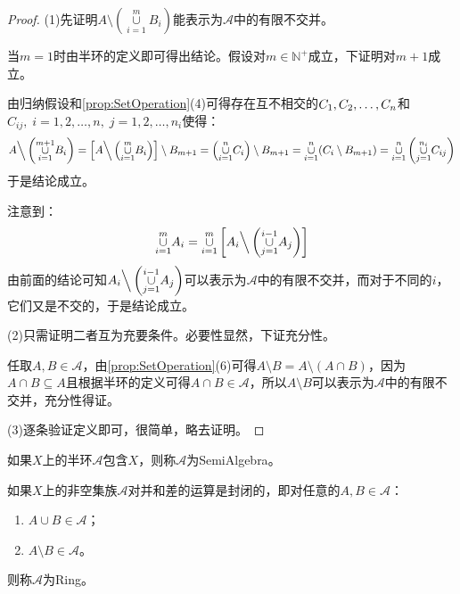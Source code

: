 \begin{proof}
	(1)先证明$A\setminus\left(\underset{i=1}{\overset{m}{\cup}}B_i\right)$能表示为$\mathscr{A}$中的有限不交并。\par
	当$m=1$时由半环的定义即可得出结论。假设对$m\in\mathbb{N}^+$成立，下证明对$m+1$成立。\par
	由归纳假设和\cref{prop:SetOperation}(4)可得存在互不相交的$C_1, C_2, \dots, C_{n}$和$C_{ij},\;i=1,2,\dots,n,\;j=1,2,\dots,n_i$使得：
	\begin{equation*}
		A\Big\backslash\left(\underset{i=1}{\overset{m+1}{\cup}}B_i\right)=\left[A\Big\backslash\left(\underset{i=1}{\overset{m}{\cup}}B_i\right)\right]\setminus B_{m+1}=\left(\underset{i=1}{\overset{n}{\cup}}C_i\right)\setminus B_{m+1}=\underset{i=1}{\overset{n}{\cup}}(C_i\setminus B_{m+1})=\underset{i=1}{\overset{n}{\cup}}\left(\underset{j=1}{\overset{n_i}{\cup}}C_{ij}\right)
	\end{equation*}
	于是结论成立。\par
	注意到：
	\begin{equation*}
		\underset{i=1}{\overset{m}{\cup}}A_i=\underset{i=1}{\overset{m}{\cup}}\left[A_i\Big\backslash\left(\underset{j=1}{\overset{i-1}{\cup}}A_j\right)\right]
	\end{equation*}
	由前面的结论可知$A_i\Big\backslash\left(\underset{j=1}{\overset{i-1}{\cup}}A_j\right)$可以表示为$\mathscr{A}$中的有限不交并，而对于不同的$i$，它们又是不交的，于是结论成立。\par
	(2)只需证明二者互为充要条件。必要性显然，下证充分性。\par
	任取$A,B\in\mathscr{A}$，由\cref{prop:SetOperation}(6)可得$A\setminus B=A\setminus(A\cap B)$，因为$A\cap B\subseteq A$且根据半环的定义可得$A\cap B\in\mathscr{A}$，所以$A\setminus B$可以表示为$\mathscr{A}$中的有限不交并，充分性得证。\par
	(3)逐条验证定义即可，很简单，略去证明。
\end{proof}
\begin{definition}
	如果$X$上的半环$\mathscr{A}$包含$X$，则称$\mathscr{A}$为\gls{SemiAlgebra}。
\end{definition}
\begin{definition}
	如果$X$上的非空集族$\mathscr{A}$对并和差的运算是封闭的，即对任意的$A,B\in\mathscr{A}$：
	\begin{enumerate}
		\item $A\cup B\in\mathscr{A}$；
		\item $A\setminus B\in\mathscr{A}$。
	\end{enumerate}
	则称$\mathscr{A}$为\gls{Ring}。
\end{definition}
